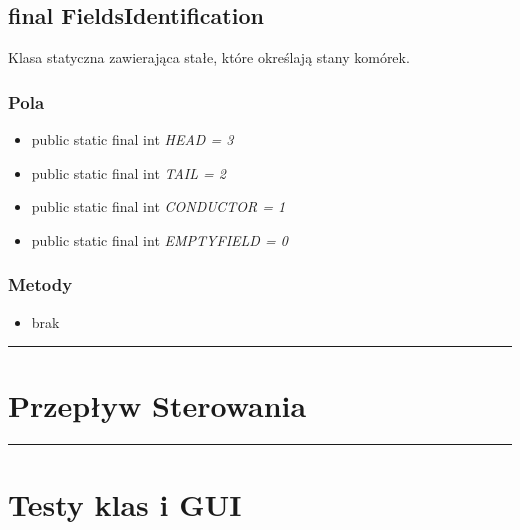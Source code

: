 \documentclass[a4paper,11pt]{article}
\newcommand{\linia}{\rule{\linewidth}{0.4mm}}
\begin{document}
\subsection{final FieldsIdentification}
Klasa statyczna zawierająca stałe, które określają stany komórek.

\subsubsection{Pola}
\begin{itemize}
\item public static final int \textit{HEAD = 3}
\item public static final int \textit{TAIL = 2}
\item public static final int \textit{CONDUCTOR = 1}
\item public static final int \textit{EMPTYFIELD = 0}
\end{itemize}
\subsubsection{Metody}
\begin{itemize}
\item brak
\end{itemize}

\noindent\linia
\section{Przepływ Sterowania}




\noindent\linia
\section{Testy klas i GUI}
\end{document}
